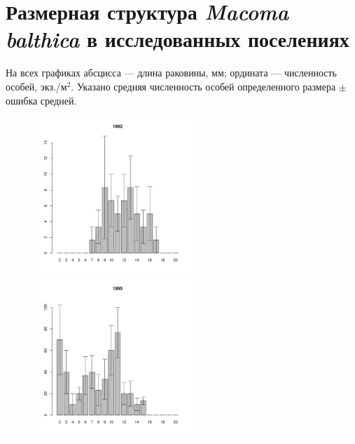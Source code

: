 \section{Размерная структура {\it Macoma balthica} в исследованных поселениях}
\label{app:sizestr_hist}

На всех графиках абсцисса --- длина раковины, мм; ордината --- численность особей, экз./м$^2$. Указано средняя численность особей определенного размера $\pm$ ошибка средней.

	\begin{figure}[hp]

	\begin{minipage}[b]{.3\linewidth}
	\begin{center}
	\includegraphics[width=60mm]{../White_Sea/Estuatiy_Luvenga/sizestr2_1992_.pdf}	
	\end{center}
	\end{minipage}
	\hfil %
	\begin{minipage}[b]{.3\linewidth}
	\begin{center}
	\includegraphics[width=60mm]{../White_Sea/Estuatiy_Luvenga/sizestr2_1995_.pdf}
	\end{center}
	\end{minipage}
	\hfil %
	\begin{minipage}[b]{.3\linewidth}

\end{minipage}
\end{figure}
